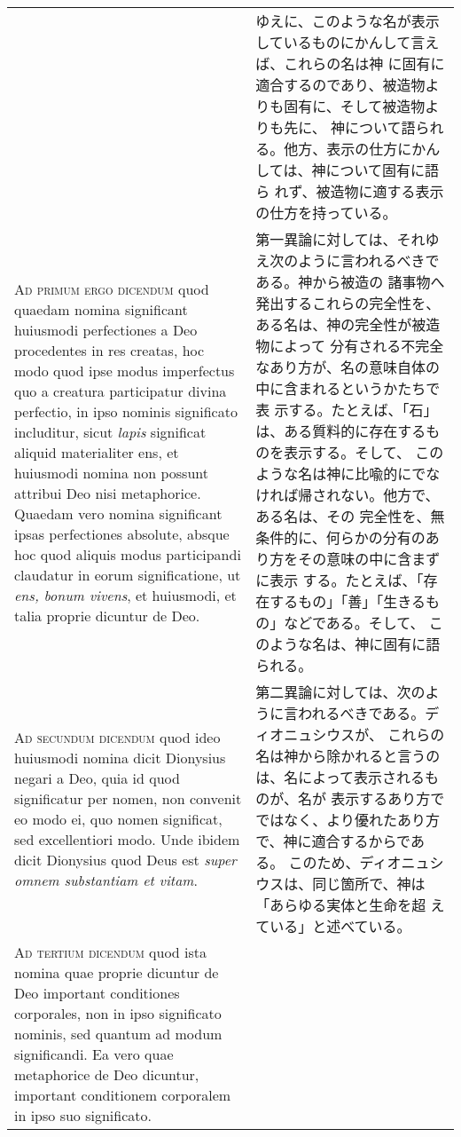 \documentclass[paper=a4paper,fontsize=10pt,jafontsize=9pt,titlepage]{jlreq}
\begin{document}
\begin{longtable}{p{21em}p{21em}}
&

ゆえに、このような名が表示しているものにかんして言えば、これらの名は神
に固有に適合するのであり、被造物よりも固有に、そして被造物よりも先に、
神について語られる。他方、表示の仕方にかんしては、神について固有に語ら
れず、被造物に適する表示の仕方を持っている。

\\

{\scshape Ad primum ergo dicendum} quod quaedam nomina significant
huiusmodi perfectiones a Deo procedentes in res creatas, hoc modo quod
ipse modus imperfectus quo a creatura participatur divina perfectio,
in ipso nominis significato includitur, sicut {\itshape lapis} significat
aliquid materialiter ens, et huiusmodi nomina non possunt attribui Deo
nisi metaphorice. Quaedam vero nomina significant ipsas perfectiones
absolute, absque hoc quod aliquis modus participandi claudatur in
eorum significatione, ut {\itshape ens, bonum vivens}, et huiusmodi, et
talia proprie dicuntur de Deo.

&

第一異論に対しては、それゆえ次のように言われるべきである。神から被造の
諸事物へ発出するこれらの完全性を、ある名は、神の完全性が被造物によって
分有される不完全なあり方が、名の意味自体の中に含まれるというかたちで表
示する。たとえば、「石」は、ある質料的に存在するものを表示する。そして、
このような名は神に比喩的にでなければ帰されない。他方で、ある名は、その
完全性を、無条件的に、何らかの分有のあり方をその意味の中に含まずに表示
する。たとえば、「存在するもの」「善」「生きるもの」などである。そして、
このような名は、神に固有に語られる。

\\

{\scshape Ad secundum dicendum} quod ideo huiusmodi nomina dicit Dionysius
negari a Deo, quia id quod significatur per nomen, non convenit eo
modo ei, quo nomen significat, sed excellentiori modo. Unde ibidem
dicit Dionysius quod Deus est {\itshape super omnem substantiam et vitam}.

&

第二異論に対しては、次のように言われるべきである。ディオニュシウスが、
これらの名は神から除かれると言うのは、名によって表示されるものが、名が
表示するあり方でではなく、より優れたあり方で、神に適合するからである。
このため、ディオニュシウスは、同じ箇所で、神は「あらゆる実体と生命を超
えている」と述べている。

\\

{\scshape Ad tertium dicendum} quod ista nomina quae proprie dicuntur de
Deo important conditiones corporales, non in ipso significato nominis,
sed quantum ad modum significandi. Ea vero quae metaphorice de Deo
dicuntur, important conditionem corporalem in ipso suo significato.


\end{longtable}
\end{document}
